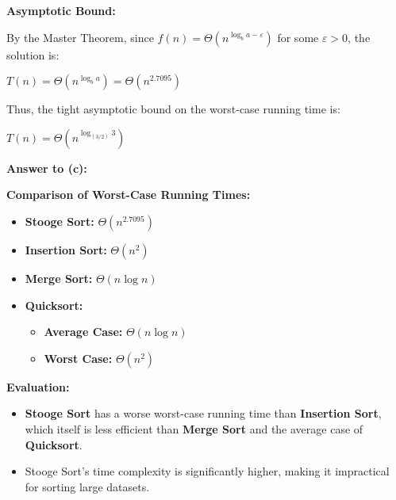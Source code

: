 \documentclass[10pt,letter,notitlepage]{article}
\begin{document}
\begin{Answer}
\textbf{Asymptotic Bound:}

By the Master Theorem, since $f(n) = \Theta\left( n^{ \log_b a - \varepsilon } \right)$ for some $\varepsilon > 0$, the solution is:


$T(n) = \Theta\left( n^{ \log_b a } \right) = \Theta\left( n^{2.7095} \right)$


Thus, the tight asymptotic bound on the worst-case running time is:


$T(n) = \Theta\left( n^{ \log_{(3/2)} 3 } \right)$

\vspace{+0.5cm}

\textbf{Answer to (c):}

\textbf{Comparison of Worst-Case Running Times:}

\begin{itemize}
\item \textbf{Stooge Sort:} $\Theta\left( n^{2.7095} \right)$
\item \textbf{Insertion Sort:} $\Theta(n^2)$
\item \textbf{Merge Sort:} $\Theta(n \log n)$
\item \textbf{Quicksort:}
\begin{itemize}
\item \textbf{Average Case:} $\Theta(n \log n)$
\item \textbf{Worst Case:} $\Theta(n^2)$
\end{itemize}
\end{itemize}

\textbf{Evaluation:}

\begin{itemize}
\item \textbf{Stooge Sort} has a worse worst-case running time than \textbf{Insertion Sort}, which itself is less efficient than \textbf{Merge Sort} and the average case of \textbf{Quicksort}.
\item Stooge Sort’s time complexity is significantly higher, making it impractical for sorting large datasets.
\end{itemize}

\end{Answer}
\end{document}
